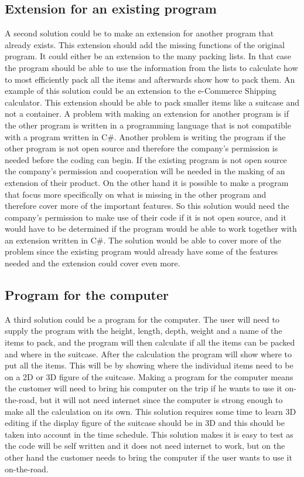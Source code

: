 \subsection{Extension for an existing program}
A second solution could be to make an extension for another program that already exists. This extension should add the missing functions of the original program. It could either be an extension to the many packing lists. In that case the program should be able to use the information from the lists to calculate how to most efficiently pack all the items and afterwards show how to pack them. An example of this solution could be an extension to the e-Commerce Shipping calculator. This extension should be able to pack smaller items like a suitcase and not a container. A problem with making an extension for another program is if the other program is written in a programming language that is not compatible with a program written in C\#. Another problem is writing the program if the other program is not open source and therefore the company's permission is needed before the coding can begin. If the existing program is not open source the company's permission and cooperation will be needed in the making of an extension of their product. On the other hand it is possible to make a program that focus more specifically on what is missing in the other program and therefore cover more of the important features. So this solution would need the company's permission to make use of their code if it is not open source, and it would have to be determined if the program would be able to work together with an extension written in C\#. The solution would be able to cover more of the problem since the existing program would already have some of the features needed and the extension could cover even more.

\subsection{Program for the computer}
A third solution could be a program for the computer. The user will need to supply the program with the height, length, depth, weight and a name of the items to pack, and the program will then calculate if all the items can be packed and where in the suitcase. After the calculation the program will show where to put all the items. This will be by showing where the individual items need to be on a 2D or 3D figure of the suitcase. Making a program for the computer means the customer will need to bring his computer on the trip if he wants to use it on-the-road, but it will not need internet since the computer is strong enough to make all the calculation on its own. This solution requires some time to learn 3D editing if the display figure of the suitcase should be in 3D and this should be taken into account in the time schedule.  This solution makes it is easy to test as the code will be self written and it does not need internet to work, but on the other hand the customer needs to bring the computer if the user wants to use it on-the-road.

